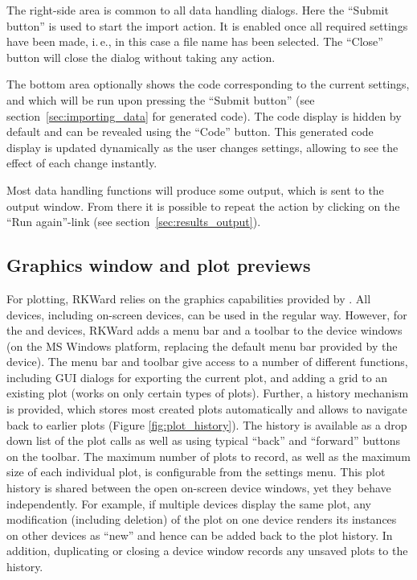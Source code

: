 The right-side area is common to all data handling
dialogs. Here the ``Submit button'' is used
to start the import action. It is enabled once all required
settings have been made, i.\,e., in this case a file name has been
selected. The ``Close'' button will close the
dialog without taking any action.

The bottom area optionally shows the 
code corresponding to the current settings, and which will be run
upon pressing the ``Submit button'' (see section~\ref{sec:importing_data} for generated  code). 
The code display is hidden by default and can be revealed using
the ``Code'' button. This 
generated code display is updated dynamically as the user changes settings, allowing
to see the effect of each change instantly.

Most data handling functions will produce some output, which is
sent to the output window. From there it is possible to repeat the
action by clicking on the ``Run again''-link
(see section~\ref{sec:results_output}).

\subsection{Graphics window and plot previews}
\label{sec:plot_previews}

For plotting, RKWard relies on the graphics capabilities provided by
. All 
devices, including on{}-screen devices, can be used in the regular way.
However, for the  and  devices, RKWard adds a menu
bar and a toolbar to the device windows (on the MS Windows platform,
replacing the default menu bar provided by the device). The menu
bar and toolbar give access to a number of different functions,
including GUI dialogs for exporting the current plot,
and adding a grid to an existing plot 
(works on only certain types of plots). Further, a history mechanism is provided,
which stores most created plots automatically and allows to navigate
back to earlier plots (Figure \ref{fig:plot_history}). 
The history is available as a drop down list of the plot calls as well as using typical ``back''
and ``forward'' buttons on the toolbar.
The maximum number
of plots to record, as well as the maximum size of each individual plot,
is configurable from the settings menu. This plot history is shared
between the open on{}-screen device windows, yet they behave
independently. For example, if multiple devices display the same
plot, any modification (including deletion) of the plot on one device
renders its instances on other devices as ``new'' and hence can be added
back to the plot history. In addition, duplicating or closing a device
window records any unsaved plots to the history.


